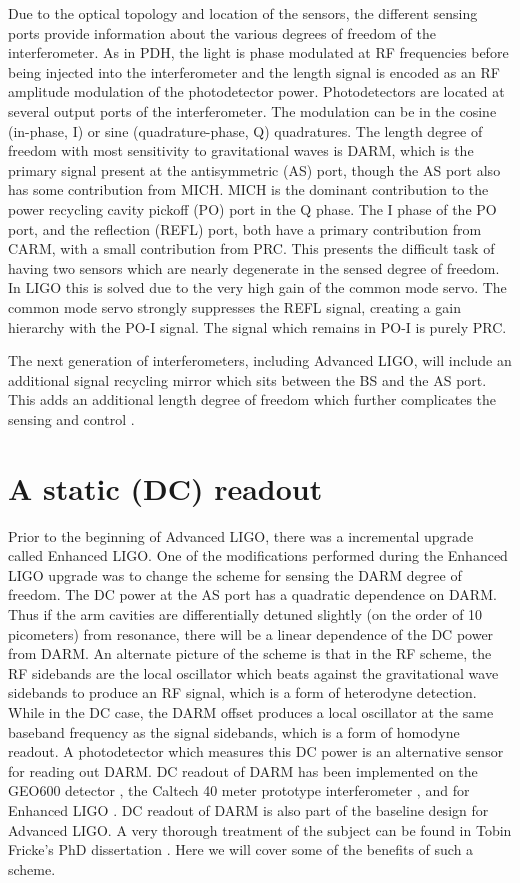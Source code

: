 Due to the optical topology and location of the sensors, the different sensing ports provide information about the various degrees of freedom of the interferometer. %
As in PDH, the light is phase modulated at RF frequencies before being injected into the interferometer and the length signal is encoded as an RF amplitude modulation of the photodetector power. %
Photodetectors are located at several output ports of the interferometer. %
The modulation can be in the cosine (in-phase, I) or sine (quadrature-phase, Q) quadratures. %
The length degree of freedom with most sensitivity to gravitational waves is DARM, which is the primary signal present at the antisymmetric (AS) port, though the AS port also has some contribution from MICH. %
MICH is the dominant contribution to the power recycling cavity pickoff (PO) port in the Q phase. %
The I phase of the PO port, and the reflection (REFL) port, both have a primary contribution from CARM, with a small contribution from PRC. %
This presents the difficult task of having two sensors which are nearly degenerate in the sensed degree of freedom. %
In LIGO this is solved due to the very high gain of the common mode servo. %
The common mode servo strongly suppresses the REFL signal, creating a gain hierarchy with the PO-I signal. %
The signal which remains in PO-I is purely PRC.

The next generation of interferometers, including Advanced LIGO, will include an additional signal recycling mirror which sits between the BS and the AS port. %
This adds an additional length degree of freedom which further complicates the sensing and control \cite{T1000298}.

\section{A static (DC) readout}
\label{sec:dcreadout}
Prior to the beginning of Advanced LIGO, there was a incremental upgrade called Enhanced LIGO. %
One of the modifications performed during the Enhanced LIGO upgrade was to change the scheme for sensing the DARM degree of freedom. %
The DC power at the AS port has a quadratic dependence on DARM. %
Thus if the arm cavities are differentially detuned slightly (on the order of 10 picometers) from resonance, there will be a linear dependence of the DC power from DARM. %
An alternate picture of the scheme is that in the RF scheme, the RF sidebands are the local oscillator which beats against the gravitational wave sidebands to produce an RF signal, which is a form of heterodyne detection. %
While in the DC case, the DARM offset produces a local oscillator at the same baseband frequency as the signal sidebands, which is a form of homodyne readout. %
A photodetector which measures this DC power is an alternative sensor for reading out DARM. %
DC readout of DARM has been implemented on the GEO600 detector \cite{GEODC}, the Caltech 40 meter prototype interferometer \cite{40mDC}, and for Enhanced LIGO \cite{Tobin}. %
DC readout of DARM is also part of the baseline design for Advanced LIGO. %
A very thorough treatment of the subject can be found in Tobin Fricke's PhD dissertation \cite{FrickeThesis}. %
Here we will cover some of the benefits of such a scheme.

